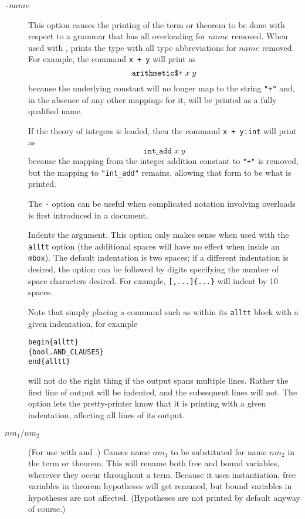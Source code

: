 \begin{description}
\item[\texttt{-}$\mathit{name}$]
%
This option causes the printing of the term or theorem to be done with respect to a grammar that has all overloading for $\mathit{name}$ removed.
When used with \holty, prints the type with all type abbreviations for $\mathit{name}$ removed.
For example, the command \texttt{\holtm[-+]\lb{}x + y\rb} will print as
\[
\texttt{arithmetic\dol+}\;x\;y
\]
because the underlying constant will no longer map to the string \texttt{"+"} and, in the absence of any other mappings for it, will be printed as a fully qualified name.

If the theory of integers is loaded, then the command \texttt{\holtm[-+]\lb{}x + y:int\rb} will print as \[
\texttt{int\_add}\;x\;y
\]
because the mapping from the integer addition constant to \texttt{"+"} is removed, but the mapping to \texttt{"int\_add"} remains, allowing that form to be what is printed.

The \texttt{-} option can be useful when complicated notation involving overloads is first introduced in a document.

\item[\texttt{\indentoption}] Indents the argument.
%
  This option only makes sense when used with the \texttt{alltt} option (the additional spaces will have no effect when inside an \texttt{\bs{}mbox}).
%
  The default indentation is two spaces; if a different indentation is desired, the option can be followed by digits specifying the number of space characters desired.
%
  For example, \texttt{\holthm{}[,...]\{...\}} will indent by 10 spaces.

  Note that simply placing a command such as \holthm{} within its \texttt{alltt} block with a given indentation, for example
\begin{alltt}
   \bs{}begin\{alltt\}
      \holthm\{bool.AND_CLAUSES\}
   \bs{}end\{alltt\}
\end{alltt}
will not do the right thing if the output spans multiple lines.
%
Rather the first line of \HOL{} output will be indented, and the subsequent lines will not.
%
The \texttt{\indentoption} option lets the pretty-printer know that it is printing with a given indentation, affecting all lines of its output.


\item[$\mathit{nm}_1\mathtt{/}\mathit{nm}_2$] (For use with \holtm{}
  and \holthm{}.)
%
Causes name $\mathit{nm}_1$ to be substituted for name $\mathit{nm}_2$ in the term or theorem.
%
This will rename both free and bound variables, wherever they occur throughout a term.
%
Because it uses instantiation, free variables in theorem hypotheses will get renamed, but bound variables in hypotheses are not affected.
%
(Hypotheses are not printed by default anyway of course.)


\end{description}
